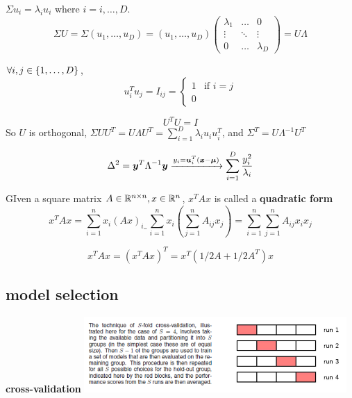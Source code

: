 \documentclass[11pt]{article}
\begin{document}
\(\Sigma u_i=\lambda_i u_i\) where \(i=i,\dots,D\).
\begin{equation*}
\Sigma U=\Sigma(u_1,\dots,u_D)=(u_1,\dots,u_D)
\begin{pmatrix}
\lambda_1 & \dots & 0\\
\vdots & \ddots & \vdots\\
0&\dots &\lambda_D
\end{pmatrix}=U\Lambda
\end{equation*}

\(\forall i,j\in\left\{ 1,\dots,D\right\}\),
\begin{equation*}
u_i^Tu_j=I_{ij}=
\begin{cases}
1&\text{if } i=j\\
0%
\end{cases}
\end{equation*}

\begin{equation*}
U^TU=I
\end{equation*}
So \(U\) is orthogonal, \(\Sigma UU^T=U\Lambda
   U^T=\displaystyle\sum_{i=1}^D\lambda_i u_iu_i^T\), and \(\Sigma^T=U\Lambda^{-1}U^T\)

\begin{equation*}
\Delta^2=\boldsymbol{y}^T\Lambda^{-1}\boldsymbol{y}\xrightarrow{y_i=\boldsymbol{u}_i^T(\boldsymbol{x}-\boldsymbol{\mu})}
\displaystyle\sum_{i=1}^D\frac{y_i^2}{\lambda_i}
\end{equation*}


GIven a square matrix \(A\in\mathbb{R}^{n\times n},x\in\mathbb{R}^n\), \(x^TAx\) is called a
\textbf{quadratic form}
\begin{equation*}
x^TAx=\displaystyle\sum_{i=1}^nx_i(Ax)_i_=\displaystyle\sum_{i=1}^n x_i
(\displaystyle\sum_{j=1}^nA_{ij}x_j)=\displaystyle\sum_{i=1}^n
\displaystyle\sum_{j=1}^nA_{ij}x_ix_j
\end{equation*}

\begin{equation*}
x^TAx=(x^TAx)^T=x^T(1/2A+1/2A^T)x
\end{equation*}
\subsection{model selection}
\label{sec:org8c9ba1e}
\textbf{cross-validation}
\includegraphics[width=100mm]{CrossValidation}
\end{document}
